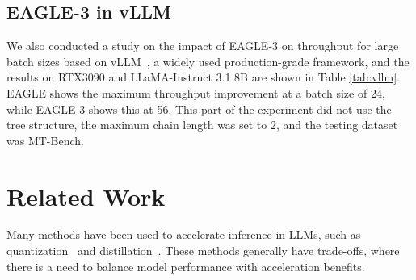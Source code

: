 \documentclass[11pt]{article}
\begin{document}
\subsection{EAGLE-3 in vLLM}

 We also conducted a study on the impact of EAGLE-3 on throughput for large batch sizes based on vLLM~\cite{kwon2023efficient}, a widely used production-grade framework, and the results on RTX3090 and LLaMA-Instruct 3.1 8B are shown in Table \ref{tab:vllm}. EAGLE shows the maximum throughput improvement at a batch size of 24, while EAGLE-3 shows this at 56. This part of the experiment did not use the tree structure, the maximum chain length was set to 2, and the testing dataset
was MT-Bench. 



\begin{table}[h]
  \centering
  \caption{Throughput improvement under different batch sizes on A100 and LLaMA-Instruct 3.1 8B for the MT-Bench dataset, with vLLM without speculative sampling as the baseline (1.00x).}
  \label{tab:vllm}%
\end{table}%

\section{Related Work}

Many methods have been used to accelerate inference in LLMs, such as quantization~\cite{hubara2018quantized,shen2020q,kim2021bert,zadeh2020gobo,zafrir2019q8bert} and distillation~\cite{hinton2015distilling}. These methods generally have trade-offs, where there is a need to balance model performance with acceleration benefits.
\end{document}
